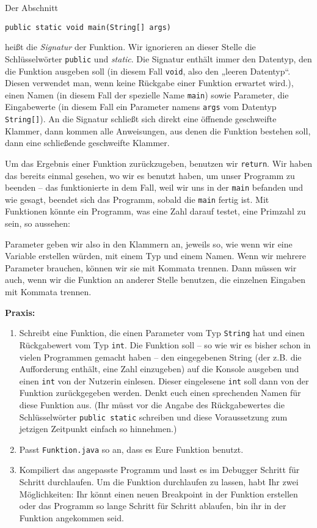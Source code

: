 Der Abschnitt
\begin{center}
  \texttt{public static void main(String[] args)}
\end{center}
heißt die \emph{Signatur} der Funktion. Wir ignorieren an dieser Stelle die
Schlüsselwörter \texttt{public} und \emph{static}. Die Signatur enthält immer
den Datentyp, den die Funktion ausgeben soll (in diesem Fall \texttt{void}, also
den „leeren Datentyp“. Diesen verwendet man, wenn keine Rückgabe einer Funktion
erwartet wird.), einen Namen (in diesem Fall der spezielle Name \texttt{main})
sowie Parameter, die Eingabewerte (in diesem Fall ein Parameter namens
\texttt{args} vom Datentyp \texttt{String[]}). An die Signatur schließt sich
direkt eine öffnende geschweifte Klammer, dann kommen alle Anweisungen, aus
denen die Funktion bestehen soll, dann eine schließende geschweifte Klammer.

Um das Ergebnis einer Funktion zurückzugeben, benutzen wir \texttt{return}. Wir
haben das bereits einmal gesehen, wo wir es benutzt haben, um unser Programm zu
beenden -- das funktionierte in dem Fall, weil wir uns in der \texttt{main}
befanden und wie gesagt, beendet sich das Programm, sobald die \texttt{main}
fertig ist. Mit Funktionen könnte ein Programm, was eine Zahl darauf testet,
eine Primzahl zu sein, so aussehen:


Parameter geben wir also in den Klammern an, jeweils so, wie wenn wir eine
Variable erstellen würden, mit einem Typ und einem Namen. Wenn wir mehrere
Parameter brauchen, können wir sie mit Kommata trennen. Dann müssen wir auch,
wenn wir die Funktion an anderer Stelle benutzen, die einzelnen Eingaben mit
Kommata trennen.

\textbf{Praxis:}
\begin{enumerate}
\item Schreibt eine Funktion, die einen Parameter vom Typ
  \texttt{String} hat und einen Rückgabewert vom Typ \texttt{int}. Die Funktion
  soll -- so wie wir es bisher schon in vielen Programmen gemacht haben -- den
  eingegebenen String (der z.B. die Aufforderung enthält, eine Zahl einzugeben)
  auf die Konsole ausgeben und einen \texttt{int} von der Nutzerin einlesen.
  Dieser eingelesene \texttt{int} soll dann von der Funktion zurückgegeben
  werden. Denkt euch einen sprechenden Namen für diese Funktion aus. (Ihr müsst
  vor die Angabe des Rückgabewertes die Schlüsselwörter \texttt{public static}
  schreiben und diese Voraussetzung zum jetzigen Zeitpunkt einfach so
  hinnehmen.)
\item Passt \texttt{Funktion.java} so an, dass es Eure Funktion benutzt.
\item Kompiliert das angepasste Programm und lasst es im Debugger Schritt für
  Schritt durchlaufen. Um die Funktion durchlaufen zu lassen, habt Ihr zwei
  Möglichkeiten: Ihr könnt einen neuen Breakpoint in der Funktion erstellen oder
  das Programm so lange Schritt für Schritt ablaufen, bin ihr in der Funktion
  angekommen seid.
\end{enumerate}

